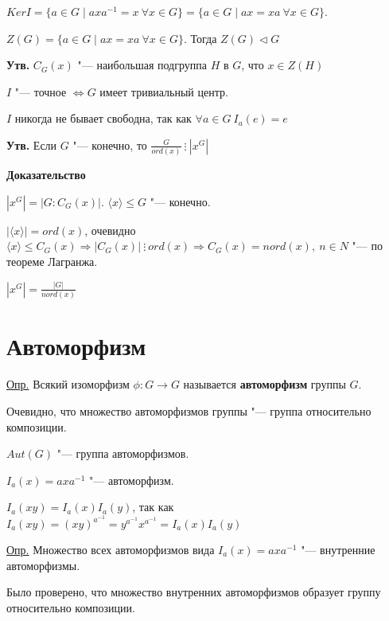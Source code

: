 \documentclass{article}
\begin{document}
$KerI = \{a \in G \mid axa^{-1} = x \  \forall x \in G\} = \{a \in G \mid ax = xa \  \forall x \in G\}$.

$Z(G) = \{a \in G \mid ax = xa \  \forall x \in G\}$. Тогда $Z(G) \triangleleft G$

\vspace{5pt}

\textbf{Утв.} $C_G(x)$ "--- наибольшая подгруппа $H$ в $G$, что $x \in Z(H)$

$I$ "--- точное $\Leftrightarrow G$ имеет тривиальный центр.

$I$ никогда не бывает свободна, так как $\forall a \in G \  I_a(e) = e$

\vspace{10pt}

\textbf{Утв.} Если $G$ "--- конечно, то $\frac{G}{ord(x)} \  \vdots \  |x^G|$

\vspace{5pt}

\textbf{Доказательство}

$|x^G| = |G:C_G(x)|$. $\langle x \rangle \leq G$ "--- конечно.

$|\langle x \rangle| = ord(x)$, очевидно $\langle x \rangle \leq C_G(x) \Rightarrow |C_G(x)| \  \vdots \  ord(x) \Rightarrow C_G(x) = nord(x), \  n \in N$ "--- по теореме Лагранжа.

$|x^G| = \frac{|G|}{nord(x)}$

\section{Автоморфизм}

\underline{Опр.} Всякий изоморфизм $\phi: G \rightarrow G$ называется \textbf{автоморфизм} группы $G$.

Очевидно, что множество автоморфизмов группы "--- группа относительно композиции.

$Aut(G)$ "--- группа автоморфизмов.

$I_a(x) = axa^{-1}$ "--- автоморфизм.

$I_a(xy) = I_a(x)I_a(y)$, так как $I_a(xy) = (xy)^{a^{-1}} = y^{a^{-1}}x^{a^{-1}} = I_a(x)I_a(y)$ 

\vspace{5pt}

\underline{Опр.} Множество всех автоморфизмов вида $I_a(x) = axa^{-1}$ "--- внутренние автоморфизмы.

\vspace{5pt}

Было проверено, что множество внутренних автоморфизмов образует группу относительно композиции.
\end{document}
